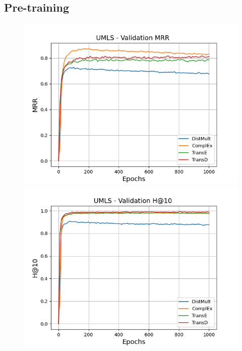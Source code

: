 \subsection{Pre-training} \label{app:subsec:pretraining}
\begin{figure}
    \centering
    \begin{minipage}{.3\textwidth}
      \centering
      \includegraphics[width=\linewidth]{figures/results/pretrain/umls/pretrain_umls_mrrs.png}
    \end{minipage}%
    \begin{minipage}{.3\textwidth}
      \centering
      \includegraphics[width=\linewidth]{figures/results/pretrain/umls/pretrain_umls_hit10.png}
    \end{minipage}

\end{figure}
